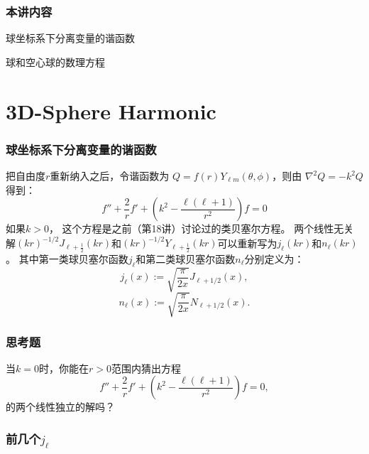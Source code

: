 \documentclass[CJK]{beamer}
\date{}
\begin{document}
\bch  
{}

\begin{frame}
\frametitle{本讲内容}

\bitem
\item{球坐标系下分离变量的谐函数}
\item{球和空心球的数理方程}
\eitem

\end{frame}



\section{3D-Sphere Harmonic}


\begin{frame}
  \frametitle{球坐标系下分离变量的谐函数}
  
  把自由度$r$重新纳入之后，令谐函数为 $Q = f(r)Y_{\ell m}(\theta,\phi)$，则由 $\nabla^2Q = -k^2Q$ 得到：
  $$ f''+\frac{2}{r}f'+\left(k^2-\frac{\ell(\ell+1)}{r^2}\right) f = 0 $$
  如果$k> 0$， 这个方程是之前（第18讲）讨论过的类贝塞尔方程。
  两个线性无关解$(kr)^{-1/2}J_{\ell+\frac{1}{2}}(kr)$和$(kr)^{-1/2}Y_{\ell+\frac{1}{2}}(kr)$可以重新写为$ j_\ell(kr)$和$n_{\ell}(kr)$。
  其中第一类球贝塞尔函数$j_\ell$和第二类球贝塞尔函数$n_\ell$分别定义为：{\blue
  $$ j_\ell(x) :=\sqrt{ \frac{\pi}{2x}} J_{\ell+1/2}(x), $$
  $$ n_\ell(x) :=\sqrt{ \frac{\pi}{2x}} N_{\ell+1/2}(x). $$  }
  
\end{frame}

\begin{frame}
  \frametitle{思考题}
  
  
  当$k=0$时，你能在$r>0$范围内猜出方程
  $$ f''+\frac{2}{r}f'+\left(k^2-\frac{\ell(\ell+1)}{r^2}\right) f = 0, $$
  的两个线性独立的解吗？  
\end{frame}


\begin{frame}
  \frametitle{前几个$j_\ell$}
  
  
\end{frame}
\end{document}
